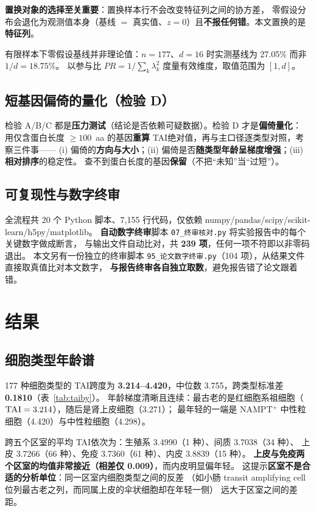\documentclass[UTF8, a4paper, 11pt]{ctexart}
\newcommand{\tai}{\textsc{TAI}}
\newcommand{\code}[1]{\texttt{\small #1}}
\begin{document}
\textbf{置换对象的选择至关重要}：置换样本行不会改变特征列之间的协方差，
零假设分布会退化为观测值本身（基线 $=$ 真实值、$z = 0$）且\textbf{不报任何错}。本文置换的是\textbf{特征列}。

有限样本下零假设基线并非理论值：$n = 177$、$d = 16$ 时实测基线为 27.05\% 而非 $1/d = 18.75\%$。
以参与比 $PR = 1/\sum_k \lambda_k^2$ 度量有效维度，取值范围为 $[1, d]$。

\subsection{短基因偏倚的量化（检验 D）}

检验 A/B/C 都是\textbf{压力测试}（结论是否依赖可疑数据）。检验 D 才是\textbf{偏倚量化}：
用仅含蛋白长度 $\ge 100$~aa 的基因\textbf{重算} \tai 绝对值，再与主口径逐类型对照，考察三件事——
(i) 偏倚的\textbf{方向与大小}；(ii) 偏倚是否\textbf{随类型年龄呈梯度增强}；(iii) \textbf{相对排序}的稳定性。
查不到蛋白长度的基因\textbf{保留}（不把“未知”当“过短”）。

\subsection{可复现性与数字终审}

全流程共 20 个 Python 脚本、7,155 行代码，仅依赖 numpy/pandas/scipy/scikit-learn/h5py/matplotlib。
\textbf{自动数字终审}脚本 \code{07\_终审核对.py} 将实验报告中的每个关键数字做成断言，
与输出文件自动比对，共 \textbf{239 项}，任何一项不符即以非零码退出。
本文另有一份独立的终审脚本 \code{95\_论文数字终审.py}（104 项），从结果文件直接取真值比对本文数字，
\textbf{与报告终审各自独立取数}，避免报告错了论文跟着错。

\section{结果}

\subsection{细胞类型年龄谱}

177 种细胞类型的 \tai 跨度为 \textbf{3.214--4.420}，中位数 3.755，跨类型标准差 \textbf{0.1810}（表~\ref{tab:taiby}）。
年龄梯度清晰且连续：最古老的是红细胞系祖细胞（$\tai = 3.214$），随后是肾上皮细胞（3.271）；
最年轻的一端是 NAMPT$^{+}$ 中性粒细胞（4.420）与中性粒细胞（4.298）。

跨五个区室的平均 \tai 依次为：生殖系 3.4990（1 种）、间质 3.7038（34 种）、
上皮 3.7266（66 种）、免疫 3.7360（61 种）、内皮 3.8839（15 种）。
\textbf{上皮与免疫两个区室的均值非常接近（相差仅 0.009）}，而内皮明显偏年轻。
这提示\textbf{区室不是合适的分析单位}：同一区室内细胞类型之间的反差
（如小肠 transit amplifying cell 位列最古老之列，而同属上皮的伞状细胞却在年轻一侧）
远大于区室之间的差距。
\end{document}
